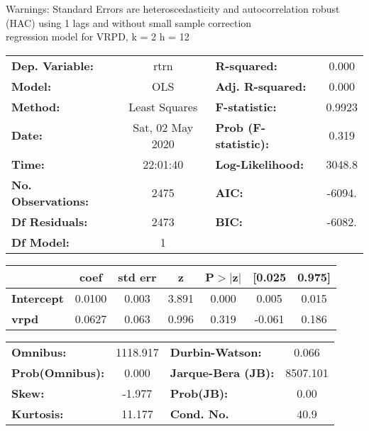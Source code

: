 Warnings: \newline
 [1] Standard Errors are heteroscedasticity and autocorrelation robust (HAC) using 1 lags and without small sample correction\\ 

regression model for VRPD, k = 2 h = 12\begin{center}
\begin{tabular}{lclc}
\toprule
\textbf{Dep. Variable:}    &       rtrn       & \textbf{  R-squared:         } &     0.000   \\
\textbf{Model:}            &       OLS        & \textbf{  Adj. R-squared:    } &     0.000   \\
\textbf{Method:}           &  Least Squares   & \textbf{  F-statistic:       } &    0.9923   \\
\textbf{Date:}             & Sat, 02 May 2020 & \textbf{  Prob (F-statistic):} &    0.319    \\
\textbf{Time:}             &     22:01:40     & \textbf{  Log-Likelihood:    } &    3048.8   \\
\textbf{No. Observations:} &        2475      & \textbf{  AIC:               } &    -6094.   \\
\textbf{Df Residuals:}     &        2473      & \textbf{  BIC:               } &    -6082.   \\
\textbf{Df Model:}         &           1      & \textbf{                     } &             \\
\bottomrule
\end{tabular}
\begin{tabular}{lcccccc}
                   & \textbf{coef} & \textbf{std err} & \textbf{z} & \textbf{P$> |$z$|$} & \textbf{[0.025} & \textbf{0.975]}  \\
\midrule
\textbf{Intercept} &       0.0100  &        0.003     &     3.891  &         0.000        &        0.005    &        0.015     \\
\textbf{vrpd}      &       0.0627  &        0.063     &     0.996  &         0.319        &       -0.061    &        0.186     \\
\bottomrule
\end{tabular}
\begin{tabular}{lclc}
\textbf{Omnibus:}       & 1118.917 & \textbf{  Durbin-Watson:     } &    0.066  \\
\textbf{Prob(Omnibus):} &   0.000  & \textbf{  Jarque-Bera (JB):  } & 8507.101  \\
\textbf{Skew:}          &  -1.977  & \textbf{  Prob(JB):          } &     0.00  \\
\textbf{Kurtosis:}      &  11.177  & \textbf{  Cond. No.          } &     40.9  \\
\bottomrule
\end{tabular}
\end{center}

